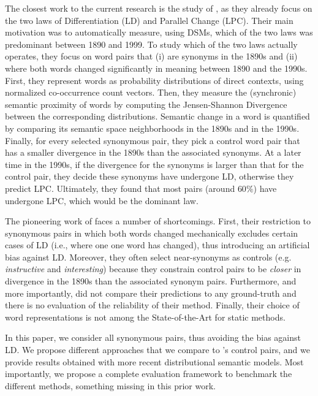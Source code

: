 \documentclass[11pt]{article}
\begin{document}
The closest work to the current research is the study of \citet{xu-kemp-2015-evaluation}, as they already focus on the two laws of Differentiation (LD) and Parallel Change (LPC). Their main motivation was to automatically measure, using DSMs, which of the two laws was predominant between 1890 and 1999. To study which of the two laws actually operates, they focus on word pairs that (i) are synonyms in the 1890s and (ii) where both words changed significantly in meaning between 1890 and the 1990s. First, they represent words as probability distributions of direct contexts, using normalized co-occurrence count vectors. Then, they measure the (synchronic) semantic proximity of words by computing the Jensen-Shannon Divergence between the corresponding distributions. Semantic change in a word is quantified by comparing its semantic space neighborhoods in the 1890s and in the 1990s. Finally, for every selected synonymous pair, they pick a control word pair that has a smaller divergence in the 1890s than the associated synonyms. At a later time in the 1990s, if the divergence for the synonyms is larger than that for the control pair, they decide these synonyms have undergone LD, otherwise they predict LPC. Ultimately, they found that most pairs (around $60\%$) have undergone LPC, which would be the dominant law.

The pioneering work of \citet{xu-kemp-2015-evaluation} faces a number of shortcomings. First, their restriction to synonymous pairs in which both words changed mechanically excludes certain cases of LD (i.e., where one one word has changed), thus introducing an artificial bias against LD. Moreover, they often select near-synonyms as controls (e.g. \textit{instructive} and \textit{interesting}) because they constrain control pairs to be \textit{closer} in divergence in the 1890s than the associated synonym pairs. Furthermore, and more importantly, \citet{xu-kemp-2015-evaluation} did not compare their predictions to any ground-truth and there is no evaluation of the reliability of their method. Finally, their choice of word representations is not among the State-of-the-Art for static methods.

In this paper, we consider all synonymous pairs, thus avoiding the bias against LD. We propose different approaches that we compare to \citet{xu-kemp-2015-evaluation}'s control pairs, and we provide results obtained with more recent distributional semantic models. Most importantly, we propose a complete evaluation framework to benchmark the different methods, something missing in this prior work.
\end{document}
